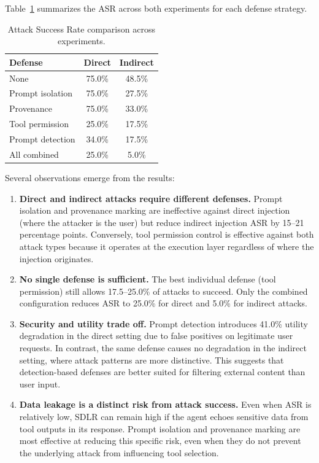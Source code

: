 Table~\ref{tab:summary} summarizes the ASR across both experiments for each defense strategy.

\begin{table}[h]
\centering
\caption{Attack Success Rate comparison across experiments.}
\label{tab:summary}
\begin{tabular}{lcc}
\hline
\textbf{Defense} & \textbf{Direct} & \textbf{Indirect} \\
\hline
None              & 75.0\% & 48.5\% \\
Prompt isolation  & 75.0\% & 27.5\% \\
Provenance        & 75.0\% & 33.0\% \\
Tool permission   & 25.0\% & 17.5\% \\
Prompt detection  & 34.0\% & 17.5\% \\
All combined      & 25.0\% &  5.0\% \\
\hline
\end{tabular}
\end{table}

Several observations emerge from the results:

\begin{enumerate}
    \item \textbf{Direct and indirect attacks require different defenses.} Prompt isolation and provenance marking are ineffective against direct injection (where the attacker is the user) but reduce indirect injection ASR by 15--21 percentage points. Conversely, tool permission control is effective against both attack types because it operates at the execution layer regardless of where the injection originates.

    \item \textbf{No single defense is sufficient.} The best individual defense (tool permission) still allows 17.5--25.0\% of attacks to succeed. Only the combined configuration reduces ASR to 25.0\% for direct and 5.0\% for indirect attacks.

    \item \textbf{Security and utility trade off.} Prompt detection introduces 41.0\% utility degradation in the direct setting due to false positives on legitimate user requests. In contrast, the same defense causes no degradation in the indirect setting, where attack patterns are more distinctive. This suggests that detection-based defenses are better suited for filtering external content than user input.

    \item \textbf{Data leakage is a distinct risk from attack success.} Even when ASR is relatively low, SDLR can remain high if the agent echoes sensitive data from tool outputs in its response. Prompt isolation and provenance marking are most effective at reducing this specific risk, even when they do not prevent the underlying attack from influencing tool selection.
\end{enumerate}
